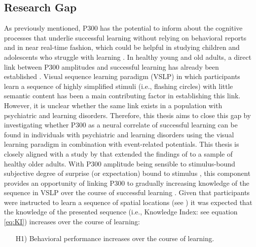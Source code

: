 \subsection{Research Gap}
As previously mentioned, P300 has the potential to inform about the cognitive processes that underlie successful learning without relying on behavioral reports and in near real-time fashion, which could be helpful in studying children and adolescents who struggle with learning \parencite{rigginsP300DevelopmentInfancy2020,steinemannTrackingNeuralCorrelates2016,strzelczykNeurophysiologicalMarkersSuccessful2022,tingaNoninvasiveNeurophysiologicalMeasures2019}. In healthy young and old adults, a direct link between P300 amplitudes and successful learning has already been established \parencite[e.g.,][]{steinemannTrackingNeuralCorrelates2016,strzelczykNeurophysiologicalMarkersSuccessful2022}. Visual sequence learning paradigm (VSLP) in which participants learn a sequence of highly simplified stimuli (i.e., flashing circles) with little semantic content has been a main contributing factor in establishing this link. However, it is unclear whether the same link exists in a population with psychiatric and learning disorders.
Therefore, this thesis aims to close this gap by investigating whether P300 as a neural correlate of successful learning can be found in individuals with psychiatric and learning disorders using the visual learning paradigm in combination with event-related potentials. This thesis is closely aligned with a study by \textcite{strzelczykNeurophysiologicalMarkersSuccessful2022} that extended the findings of \textcite{steinemannTrackingNeuralCorrelates2016} to a sample of healthy older adults. 
With P300 amplitude being sensible to stimulus-bound subjective degree of surprise (or expectation) bound to stimulus \parencite{donchinSurpriseSurprise1981,duncan-johnsonQuantifyingSurpriseVariation1977,marsTrialbyTrialFluctuationsEventRelated2008,suttonEvokedPotentialCorrelatesStimulus1965}, this component provides an opportunity of linking P300 to gradually increasing knowledge of the sequence in VSLP over the course of successful learning \parencite{steinemannTrackingNeuralCorrelates2016}. Given that participants were instructed to learn a sequence of spatial locations (see ) it was expected that the knowledge of the presented sequence (i.e., Knowledge Index: see equation \ref{eq:KI}) increases over the course of learning: 
\begin{enumerate}
     \item[H1)] Behavioral performance increases over the course of learning.
\end{enumerate}


